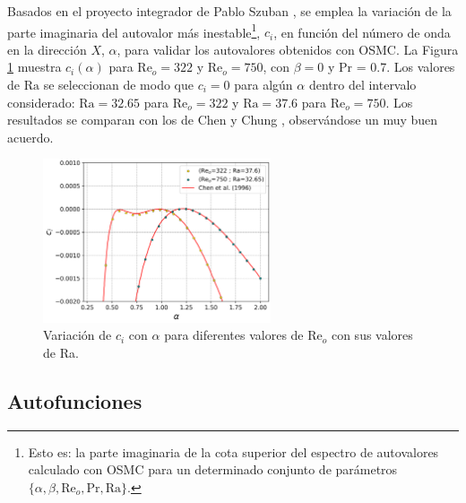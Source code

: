 Basados en el proyecto integrador de Pablo Szuban \cite{szuban2023}, se emplea la variación de la parte imaginaria del autovalor más inestable\footnote{Esto es: la parte imaginaria de la cota superior del espectro de autovalores calculado con OSMC para un determinado conjunto de parámetros $\lbrace \alpha, \beta, \text{Re}_o, \text{Pr}, \text{Ra} \rbrace$.}, $c_i$, en función del número de onda en la dirección $X$, $\alpha$, para validar los autovalores obtenidos con OSMC. La Figura \ref{fig:eigenval_alpha} muestra $c_i(\alpha)$ para $\mathrm{Re}_o=322$ y $\mathrm{Re}_o=750$, con $\beta=0$ y Pr = 0.7. Los valores de $\mathrm{Ra}$ se seleccionan de modo que $c_i=0$ para algún $\alpha$ dentro del intervalo considerado: $\mathrm{Ra}=32$.$65$ para \linebreak $\mathrm{Re}_o=322$ y $\mathrm{Ra}=37$.$6$ para $\mathrm{Re}_o=750$. Los resultados se comparan con los de Chen y \linebreak Chung \cite{chen1996linear}, observándose un muy buen acuerdo.

\begin{figure}[H]
	 \centering
    	\includegraphics[width=0.6\textwidth]{figures/cap4/osmc/eigenvalues.png}
	 \caption{Variación de $c_i$ con $\alpha$ para diferentes valores de Re$_o$ con sus valores de Ra.} 
 \label{fig:eigenval_alpha}
\end{figure}


\subsection{Autofunciones}

